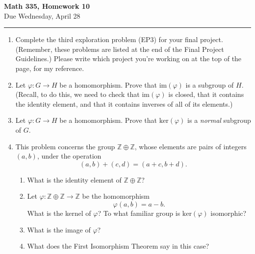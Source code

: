 \documentclass[11pt,twoside]{article}
\begin{document}
\begin{center}
{\bf \Large Math 335, Homework 10}\\
\vspace{0.1in}
{\Large Due Wednesday, April 28}
\vspace{0.1cm}
\end{center}

\hrule

\vspace{.2in}

\begin{enumerate}

 
 \item Complete the third exploration problem (EP3) for your final project.  (Remember, these problems are listed at the end of the Final Project Guidelines.)  Please write which project you're working on at the top of the page, for my reference.
 
\vspace{0.5cm}

\item Let $\varphi: G \rightarrow H$ be a homomorphism.  Prove that $\text{im}(\varphi)$ is a subgroup of $H$.  (Recall, to do this, we need to check that $\text{im}(\varphi)$ is closed, that it contains the identity element, and that it contains inverses of all of its elements.)

\vspace{0.5cm}

\item Let $\varphi: G \rightarrow H$ be a homomorphism.  Prove that $\text{ker}(\varphi)$ is a {\it normal} subgroup of $G$.

\vspace{0.5cm}

\item This problem concerns the group $\mathbb{Z} \oplus \mathbb{Z}$, whose elements are pairs of integers $(a,b)$, under the operation
\[(a,b) + (c,d) = (a+c, b + d).\]

\vspace{0.25cm}

\begin{enumerate}

\item What is the identity element of $\mathbb{Z} \oplus \mathbb{Z}$?

\vspace{0.25cm}

\item Let $\varphi: \mathbb{Z} \oplus \mathbb{Z} \rightarrow \mathbb{Z}$ be the homomorphism
\[\varphi(a,b) = a-b.\]
What is the kernel of $\varphi$?  To what familiar group is $\text{ker}(\varphi)$ isomorphic?

\vspace{0.25cm}

\item What is the image of $\varphi$?

\vspace{0.25cm}

\item What does the First Isomorphism Theorem say in this case?

\end{enumerate}

\end{enumerate}
\end{document}

